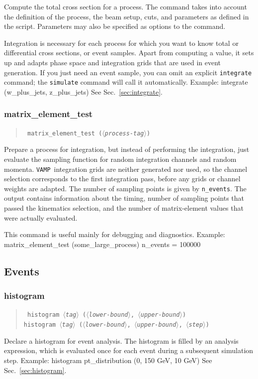 \documentclass[12pt]{book}
\newenvironment{code}%
  {\begingroup\footnotesize
   \quote
   \verbatim}%
  {\endverbatim
   \endquote
   \endgroup\noindent}
\newenvironment{syntax}%
  {\begin{quote}
   \begin{flushleft}\tt}%
  {\end{flushleft}
   \end{quote}}
\newcommand{\var}[1]{$\langle$\textit{#1}$\rangle$}
\newcommand{\ttt}[1]{\texttt{#1}}
\newcommand{\vamp}{\texttt{VAMP}}
\begin{document}
Compute the total cross section for a process.  The command takes into account
the definition of the process, the beam setup, cuts, and parameters as defined
in the script.  Parameters may also be specified as options to the command.

Integration is necessary for each process for which you want to know total or
differential cross sections, or event samples.  Apart from computing a value,
it sets up and adapts phase space and integration grids that are used in event
generation.   If you just need an event sample, you can omit an explicit
\ttt{integrate} command; the \ttt{simulate} command will call it
automatically.  Example:
\begin{code}
integrate (w_plus_jets, z_plus_jets)
\end{code}
See Sec.~\ref{sec:integrate}.


\subsubsection{matrix\_element\_test}
\begin{syntax}
matrix\_element\_test (\var{process-tag})
\end{syntax}
Prepare a process for integration, but instead of performing the
integration, just evaluate the sampling function for random
integration channels and random momenta.  \vamp\ integration grids are
neither generated nor used, so the channel selection corresponds to
the first integration pass, before any grids or channel weights are
adapted.  The number of sampling points is given by \verb|n_events|.
The output contains information about the timing, number of sampling
points that passed the kinematics selection, and the number of
matrix-element values that were actually evaluated.

This command is useful mainly for debugging and diagnostics.  Example:
\begin{code}
matrix_element_test (some_large_process) { n_events = 100000 }
\end{code}


\subsection{Events}

\subsubsection{histogram}
\begin{syntax}
histogram \var{tag} (\var{lower-bound}, \var{upper-bound}) \\
histogram \var{tag} (\var{lower-bound}, \var{upper-bound}, \var{step}) \\
\end{syntax}
Declare a histogram for event analysis.  The histogram is filled by an
analysis expression, which is evaluated once for each event during a
subsequent simulation step.  Example:
\begin{code}
histogram pt_distribution (0, 150 GeV, 10 GeV)
\end{code}
See Sec.~\ref{sec:histogram}.
\end{document}
